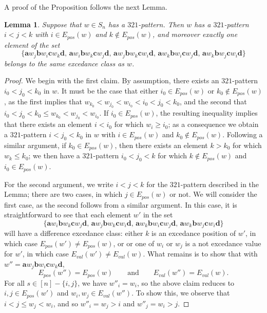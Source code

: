 \documentclass[12pt]{article}
\newtheorem{lem}[equation]{Lemma}
\theoremstyle{definition}
\theoremstyle{remark}
\numberwithin{equation}{section}
\renewcommand{\setminus}{-}
\newcommand{\EP}{E_{pos}}
\newcommand{\EV}{E_{val}}
\begin{document}
A proof of the Proposition follows the next Lemma.

\begin{lem}
\label{lem:321excedance}
Suppose that $w \in S_{n}$ has a $321$-pattern.  Then $w$ has a $321$-pattern $i < j < k$ with $i \in \EP(w)$ and $k \notin \EP(w)$, and moreover exactly one element of the set 
\[
\{
\mathbf{a}w_{j}\mathbf{b}w_{i}\mathbf{c}w_{k}\mathbf{d},  \,
\mathbf{a}w_{i}\mathbf{b}w_{k}\mathbf{c}w_{j}\mathbf{d}, \,
\mathbf{a}w_{j}\mathbf{b}w_{k}\mathbf{c}w_{i}\mathbf{d}, \,
\mathbf{a}w_{k}\mathbf{b}w_{i}\mathbf{c}w_{j}\mathbf{d}, \,
\mathbf{a}w_{k}\mathbf{b}w_{j}\mathbf{c}w_{i}\mathbf{d}
\}
\]
belongs to the same excedance class as $w$.
\end{lem}
\begin{proof}
We begin with the first claim.  
By assumption, there exists an $321$-pattern $i_{0} < j_{0} < k_{0}$ in $w$.  
It must be the case that either $i_{0} \in \EP(w)$ or $k_{0} \notin \EP(w)$, as the first implies that $w_{k_{0}} < w_{j_{0}} < w_{i_{0}} < i_{0} < j_{0} < k_{0}$, and the second that $i_{0} < j_{0} < k_{0} \le w_{k_{0}} < w_{j_{0}} < w_{i_{0}}$.
If $i_{0} \in \EP(w)$, the resulting inequality implies that there exists an element $i < i_{0}$ for which $w_{i} \ge i_{0}$; as a consequence we obtain a $321$-pattern $i < j_{0} < k_{0}$ in $w$ with $i \in \EP(w)$ and $k_{0} \notin \EP(w)$.  
Following a similar argument, if $k_{0} \in \EP(w)$, then there exists an element $k > k_{0}$ for which $w_{k} \le k_{0}$; we then have a $321$-pattern $i_{0} < j_{0} < k$ for which $k \notin \EP(w)$ and $i_{0} \in \EP(w)$.

For the second argument, we write $i < j < k$ for the $321$-pattern described in the Lemma; there are two cases, in which $j \in \EP(w)$ or not.  We will consider the first case, as the second follows from a similar argument.  In this case, it is straightforward to see that each element $w'$ in the set
\[
\{
\mathbf{a}w_{i}\mathbf{b}w_{k}\mathbf{c}w_{j}\mathbf{d}, \,
\mathbf{a}w_{j}\mathbf{b}w_{k}\mathbf{c}w_{i}\mathbf{d}, \,
\mathbf{a}w_{k}\mathbf{b}w_{i}\mathbf{c}w_{j}\mathbf{d}, \,
\mathbf{a}w_{k}\mathbf{b}w_{j}\mathbf{c}w_{i}\mathbf{d}
\}
\]
will have a difference excedance class: either $k$ is an excedance position of $w'$, in which case $\EP(w') \neq \EP(w)$, or  or one of $w_{i}$ or $w_{j}$ is a not excedance value for $w'$, in which case $\EV(w') \neq \EV(w)$.  What remains is to show that with $w'' = \mathbf{a}w_{j}\mathbf{b}w_{i}\mathbf{c}w_{k}\mathbf{d}$, 
\[
\EP(w'') = \EP(w)
\qquad\text{and}\qquad
\EV(w'') = \EV(w).
\]
For all $s \in [n] \setminus \{i, j\}$, we have $w''_{i} = w_{i}$, so the above claim reduces to $i, j \in \EP(w')$ and $w_{i}, w_{j} \in \EV(w'')$.  To show this, we observe that $i < j \le w_{j} < w_{i}$, and so $w''_{i} = w_{j} > i$ and $w''_{j} = w_{i} > j$.
\end{proof}
\end{document}
